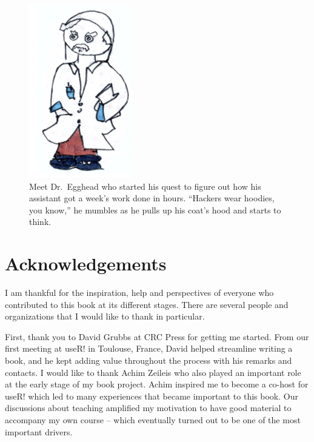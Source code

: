 \documentclass[
  12pt,
  letterpaper,
]{krantz}
\begin{document}
\begin{figure}

{\centering \includegraphics{./images/meet_egghead.jpg}

}

\caption{Meet Dr.~Egghead who started his quest to figure out how his
assistant got a week's work done in hours. ``Hackers wear hoodies, you
know,'' he mumbles as he pulls up his coat's hood and starts to think.}

\end{figure}

\hypertarget{acknowledgements}{%
\section*{Acknowledgements}\label{acknowledgements}}


I am thankful for the inspiration, help and perspectives of everyone who
contributed to this book at its different stages. There are several
people and organizations that I would like to thank in particular.

First, thank you to David Grubbs at CRC Press for getting me started.
From our first meeting at useR! in Toulouse, France, David helped
streamline writing a book, and he kept adding value throughout the
process with his remarks and contacts. I would like to thank Achim
Zeileis who also played an important role at the early stage of my book
project. Achim inspired me to become a co-host for useR! which led to
many experiences that became important to this book. Our discussions
about teaching amplified my motivation to have good material to
accompany my own course -- which eventually turned out to be one of the
most important drivers.
\end{document}

